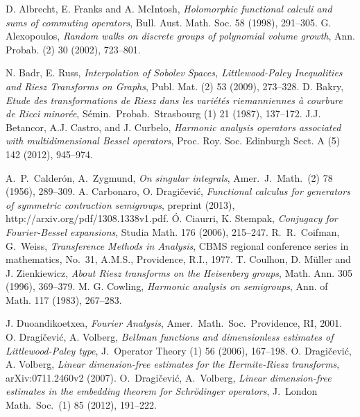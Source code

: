 \documentclass[leqno,12pt]{amsart}
\theoremstyle{definition}
\theoremstyle{remark}
\begin{document}
\begin{thebibliography}{16}
 D. Albrecht, E. Franks and A. McIntosh, \textit{Holomorphic functional calculi and sums of commuting operators}, Bull. Aust. Math. Soc. 58 (1998), 291--305.
 G. Alexopoulos, \textit{Random walks on discrete groups of polynomial volume growth}, Ann. Probab. (2) 30 (2002), 723--801.

 N. Badr, E. Russ, \textit{Interpolation of Sobolev Spaces, Littlewood-Paley Inequalities and Riesz Transforms on Graphs}, Publ. Mat. (2) 53 (2009), 273--328.
 D. Bakry, \textit{Etude des transformations de Riesz dans les variétés riemanniennes \`a courbure de Ricci minorée}, Sémin.\ Probab.\ Strasbourg (1) 21 (1987), 137--172.
 J.J. Betancor, A.J. Castro, and J. Curbelo, \textit{Harmonic analysis operators associated with multidimensional Bessel operators}, Proc. Roy. Soc. Edinburgh Sect. A (5) 142 (2012), 945--974.

 A.\ P.\ Calder\'on, A.\ Zygmund, \textit{On singular integrals}, Amer.\ J.\ Math.\ (2) 78 (1956), 289--309.
 A. Carbonaro, O. Dragi\v{c}evi\'{c}, \textit{Functional calculus for generators of symmetric contraction semigroups}, preprint (2013), http://arxiv.org/pdf/1308.1338v1.pdf.
    \'O. Ciaurri, K. Stempak, \textit{Conjugacy for Fourier-Bessel expansions}, Studia Math. 176 (2006), 215--247.
 R.\ R.\ Coifman, G.\ Weiss, \textit{Transference Methods in Analysis}, CBMS regional conference series in mathematics, No.\ 31, A.M.S., Providence, R.I., 1977.
T{.} Coulhon, D{.} M\"uller and J{.} Zienkiewicz,
\emph{About Riesz transforms on the Heisenberg groups},
Math{.} Ann{.} 305 (1996), 369--379.
 M. G. Cowling, \textit{Harmonic analysis on semigroups}, Ann. of Math. 117 (1983), 267--283.

 J. Duoandikoetxea, \textit{Fourier Analysis}, Amer.\ Math.\ Soc.\, Providence, RI, 2001.
 O. Dragi\v{c}evi\'{c}, A. Volberg, \textit{Bellman functions and dimensionless estimates of Littlewood-Paley type}, J.\ Operator
Theory (1) 56 (2006), 167--198.
 O. Dragi\v{c}evi\'{c}, A. Volberg, \textit{Linear dimension-free estimates for the Hermite-Riesz transforms}, arXiv:0711.2460v2 (2007).
 O.\ Dragi\v{c}evi\'{c}, A.\ Volberg, \textit{Linear dimension-free estimates in the embedding theorem for Schr\"odinger operators},  J.\ London Math.\ Soc.\ (1) 85 (2012), 191--222.


\end{thebibliography}
\end{document}
